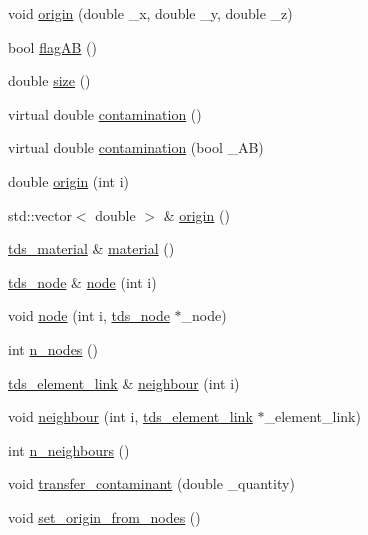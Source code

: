 \begin{DoxyCompactItemize}
\item 
void \hyperlink{classtds__element_ae2355a832ead2e50c17a8782ad8d1496}{origin} (double \-\_\-x, double \-\_\-y, double \-\_\-z)
\item 
bool \hyperlink{classtds__element_a44d414a3db34a21320fb70f86f401734}{flag\-A\-B} ()
\item 
double \hyperlink{classtds__element_a670d658914fce47e7312a170634c47ea}{size} ()
\item 
virtual double \hyperlink{classtds__element_a7dcc7e1ad86d6c64368d1e6215cb662a}{contamination} ()
\item 
virtual double \hyperlink{classtds__element_a5467abfd0fc166336152a668f0f9b67e}{contamination} (bool \-\_\-\-A\-B)
\item 
double \hyperlink{classtds__element_a737aecedf7dbb0016d0863878f36ca95}{origin} (int i)
\item 
std\-::vector$<$ double $>$ \& \hyperlink{classtds__element_adf1bf79b2b09a06dd6a050cbb90512ce}{origin} ()
\item 
\hyperlink{classtds__material}{tds\-\_\-material} \& \hyperlink{classtds__element_ac06226815fbc171b44a45ef854fe4afd}{material} ()
\item 
\hyperlink{classtds__node}{tds\-\_\-node} \& \hyperlink{classtds__element_a66d829f294782942cf58f6b296f0c3c7}{node} (int i)
\item 
void \hyperlink{classtds__element_a48384c3ca84b54177be7cd67bbc2a5d6}{node} (int i, \hyperlink{classtds__node}{tds\-\_\-node} $\ast$\-\_\-node)
\item 
int \hyperlink{classtds__element_ab79398ce1ba6a67ac5510e44d51b6418}{n\-\_\-nodes} ()
\item 
\hyperlink{classtds__element__link}{tds\-\_\-element\-\_\-link} \& \hyperlink{classtds__element_a83225c7ac9e0577fe9725945319e8783}{neighbour} (int i)
\item 
void \hyperlink{classtds__element_aa14cf978563685ebbf877f6f7518bcb9}{neighbour} (int i, \hyperlink{classtds__element__link}{tds\-\_\-element\-\_\-link} $\ast$\-\_\-element\-\_\-link)
\item 
int \hyperlink{classtds__element_ac41dd60ba9599e0277fe3438f4a2aad0}{n\-\_\-neighbours} ()
\item 
void \hyperlink{classtds__element_ab100134034c37c8c7f6872333cd619f5}{transfer\-\_\-contaminant} (double \-\_\-quantity)
\item 
void \hyperlink{classtds__element_a365817d60d2da273a512db3c8a3a1617}{set\-\_\-origin\-\_\-from\-\_\-nodes} ()
\item 

\end{DoxyCompactItemize}
